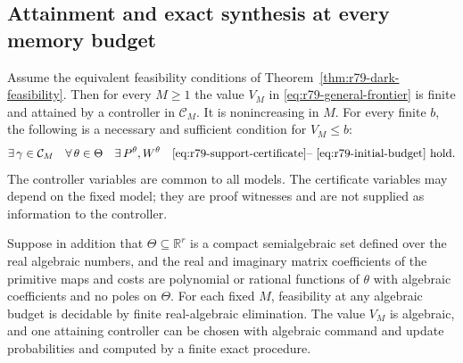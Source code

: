 \subsection{Attainment and exact synthesis at every memory budget}

\begin{theorem}
\label{thm:r79-quantum-frontier}
Assume the equivalent feasibility conditions of
Theorem~\ref{thm:r79-dark-feasibility}.  Then for every $M\ge1$ the
value $V_M$ in \eqref{eq:r79-general-frontier} is finite and attained
by a controller in $\mathcal C_M$.  It is nonincreasing in $M$.
For every finite $b$, the following is a necessary and sufficient
condition for $V_M\le b$:
\begin{equation}\label{eq:r79-robust-budget-quantifiers}
 \exists\,\gamma\in\mathcal C_M\quad
 \forall\,\theta\in\Theta\quad
 \exists\,P^\theta,W^\theta\quad
 \text{\eqref{eq:r79-support-certificate}--
       \eqref{eq:r79-initial-budget} hold.}
\end{equation}
The controller variables are common to all models.  The certificate
variables may depend on the fixed model; they are proof witnesses
and are not supplied as information to the controller.

Suppose in addition that $\Theta\subseteq\mathbb R^r$ is a compact
semialgebraic set defined over the real algebraic numbers, and the
real and imaginary matrix coefficients of the primitive maps and
costs are polynomial or rational functions of $\theta$ with algebraic
coefficients and no poles on $\Theta$.  For each fixed $M$, feasibility
at any algebraic budget is decidable by finite real-algebraic
elimination.  The value $V_M$ is algebraic, and one attaining
controller can be chosen with algebraic command and update
probabilities and computed by a finite exact procedure.
\end{theorem}
